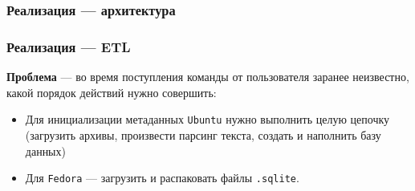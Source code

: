 \documentclass{beamer}
\begin{document}
\begin{frame}[fragile]
	\frametitle{Реализация --- архитектура}
	\begin{figure}[ht]
		\centering
		
	\end{figure}
\end{frame}

% 		



\begin{frame}[t]
	\frametitle{Реализация --- ETL}
	\textbf{Проблема} --- во время поступления команды от пользователя заранее неизвестно, какой порядок действий нужно совершить:
	\begin{itemize}
		\item Для инициализации метаданных \texttt{Ubuntu} нужно выполнить целую цепочку (загрузить архивы, произвести парсинг текста, создать и наполнить базу данных)
		\item Для \texttt{Fedora} --- загрузить и распаковать файлы \texttt{.sqlite}.
	\end{itemize}
\end{frame}
\end{document}
